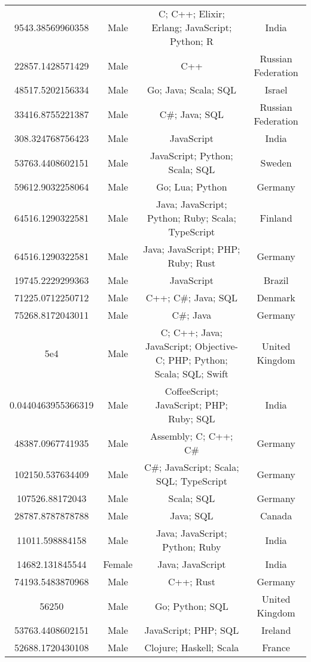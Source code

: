 \begin{center}
\begin{tabular}{ |c|c|c|c| }
9543.38569960358  &  Male  &  C; C++; Elixir; Erlang; JavaScript; Python; R  &  India  \\ 
22857.1428571429  &  Male  &  C++  &  Russian Federation  \\ 
48517.5202156334  &  Male  &  Go; Java; Scala; SQL  &  Israel  \\ 
33416.8755221387  &  Male  &  C\#; Java; SQL  &  Russian Federation  \\ 
308.324768756423  &  Male  &  JavaScript  &  India  \\ 
53763.4408602151  &  Male  &  JavaScript; Python; Scala; SQL  &  Sweden  \\ 
59612.9032258064  &  Male  &  Go; Lua; Python  &  Germany  \\ 
64516.1290322581  &  Male  &  Java; JavaScript; Python; Ruby; Scala; TypeScript  &  Finland  \\ 
64516.1290322581  &  Male  &  Java; JavaScript; PHP; Ruby; Rust  &  Germany  \\ 
19745.2229299363  &  Male  &  JavaScript  &  Brazil  \\ 
71225.0712250712  &  Male  &  C++; C\#; Java; SQL  &  Denmark  \\ 
75268.8172043011  &  Male  &  C\#; Java  &  Germany  \\ 
5e4  &  Male  &  C; C++; Java; JavaScript; Objective-C; PHP; Python; Scala; SQL; Swift  &  United Kingdom  \\ 
0.0440463955366319  &  Male  &  CoffeeScript; JavaScript; PHP; Ruby; SQL  &  India  \\ 
48387.0967741935  &  Male  &  Assembly; C; C++; C\#  &  Germany  \\ 
102150.537634409  &  Male  &  C\#; JavaScript; Scala; SQL; TypeScript  &  Germany  \\ 
107526.88172043  &  Male  &  Scala; SQL  &  Germany  \\ 
28787.8787878788  &  Male  &  Java; SQL  &  Canada  \\ 
11011.598884158  &  Male  &  Java; JavaScript; Python; Ruby  &  India  \\ 
14682.131845544  &  Female  &  Java; JavaScript  &  India  \\ 
74193.5483870968  &  Male  &  C++; Rust  &  Germany  \\ 
56250  &  Male  &  Go; Python; SQL  &  United Kingdom  \\ 
53763.4408602151  &  Male  &  JavaScript; PHP; SQL  &  Ireland  \\ 
52688.1720430108  &  Male  &  Clojure; Haskell; Scala  &  France  \\ 

\end{tabular}
\end{center}
